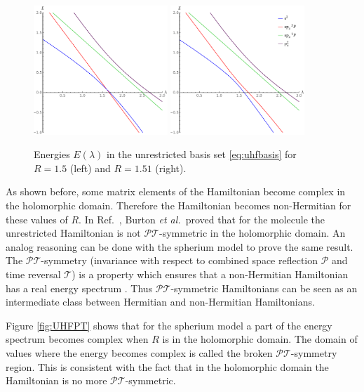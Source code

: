 \documentclass[11pt,a4paper]{article}
\newcommand{\pt}{$\mathcal{PT}$}
\begin{document}
\begin{figure}
    \centering
    \includegraphics[width=0.45\textwidth]{UHFCI.pdf}
    \includegraphics[width=0.45\textwidth]{UHFEP.pdf}
    \caption{Energies $E(\lambda)$ in the unrestricted basis set \eqref{eq:uhfbasis} for $R=1.5$ (left) and $R=1.51$ (right).}
    \label{fig:UHFEP}
\end{figure}

As shown before, some matrix elements of the Hamiltonian become complex in the holomorphic domain. Therefore the Hamiltonian becomes non-Hermitian for these values of $R$. In Ref.~\cite{Burton_2019a}, Burton \textit{et al.}~proved that for the  molecule the unrestricted Hamiltonian is not \pt -symmetric in the holomorphic domain. An analog reasoning can be done with the spherium model to prove the same result. The \pt -symmetry (invariance with respect to combined space reflection $\mathcal{P}$ and time reversal $\mathcal{T}$) is a property which ensures that a non-Hermitian Hamiltonian has a real energy spectrum \cite{BenderBook}. Thus \pt -symmetric Hamiltonians can be seen as an intermediate class between Hermitian and non-Hermitian Hamiltonians.

Figure \ref{fig:UHFPT} shows that for the spherium model a part of the energy spectrum becomes complex when $R$ is in the holomorphic domain. The domain of values where the energy becomes complex is called the broken \pt-symmetry region. This is consistent with the fact that in the holomorphic domain the Hamiltonian is no more \pt -symmetric. 
\end{document}
